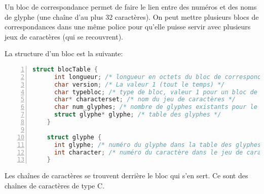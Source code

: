 \documentclass[a4paper]{iutvexam}
\begin{document}
\begin{questions}

  Un bloc de correspondance permet de faire le lien entre des numéros et
  des noms de glyphe (une chaîne d'au plus 32 caractères). On peut
  mettre plusieurs blocs de correspondances dans une même police pour
  qu'elle puisse servir avec plusieurs jeux de caractères (qui se
  recouvrent).

  La structure d'un bloc est la suivante:
  \begin{lstlisting}[numbers=left,language=C,caption=Programme]
    struct blocTable {
      int longueur; /* longueur en octets du bloc de correspondance, y compris tableau et chaîne de caractères */
      char version; /* La valeur 1 (tout le temps) */
      char typebloc; /* type de bloc, valeur 1 pour un bloc de correspondances */
      char* characterset; /* nom du jeu de caractères */
      char num_glyphes; /* nombre de glyphes existants pour le jeu de caractères */
      struct glyphe* glyphe; /* table des glyphes */
    }

    struct glyphe {
      int glyphe; /* numéro du glyphe dans la table des glyphes */
      int character; /* numéro du caractère dans le jeu de caractère */
    }
  \end{lstlisting}

  Les chaînes de caractères se trouvent derrière le bloc qui s'en sert. Ce sont des chaînes de caractères de type C.
\end{questions}
\end{document}
